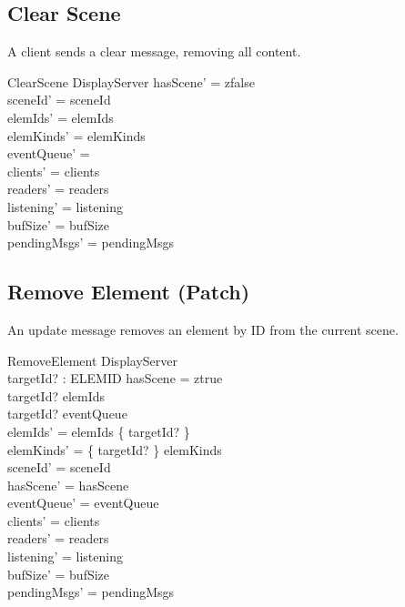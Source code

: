 \documentclass[a4paper,10pt,fleqn]{article}
\begin{document}
\subsection{Clear Scene}

A client sends a clear message, removing all content.

\begin{schema}{ClearScene}
  \Delta DisplayServer
  \where
  hasScene' = zfalse \\
  sceneId' = sceneId \\
  elemIds' = elemIds \\
  elemKinds' = elemKinds \\
  eventQueue' = \emptyset \\
  clients' = clients \\
  readers' = readers \\
  listening' = listening \\
  bufSize' = bufSize \\
  pendingMsgs' = pendingMsgs
\end{schema}

\subsection{Remove Element (Patch)}

An update message removes an element by ID from the current scene.

\begin{schema}{RemoveElement}
  \Delta DisplayServer \\
  targetId? : ELEMID
  \where
  hasScene = ztrue \\
  targetId? \in elemIds \\
  targetId? \notin eventQueue \\
  elemIds' = elemIds \setminus \{ targetId? \} \\
  elemKinds' = \{ targetId? \} \ndres elemKinds \\
  sceneId' = sceneId \\
  hasScene' = hasScene \\
  eventQueue' = eventQueue \\
  clients' = clients \\
  readers' = readers \\
  listening' = listening \\
  bufSize' = bufSize \\
  pendingMsgs' = pendingMsgs
\end{schema}
\end{document}
